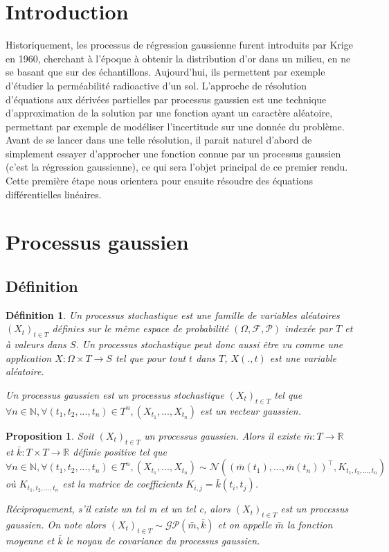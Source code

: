 \documentclass[a4paper,12pt]{article}
\newtheorem{definition}{Définition}
\newtheorem{proposition}{Proposition}
\begin{document}
\tableofcontents

\section{Introduction}

Historiquement, les processus de régression gaussienne furent introduits par Krige en 1960,
 cherchant à l’époque à obtenir la distribution d’or dans un milieu, en ne se basant que 
 sur des échantillons. Aujourd’hui, ils permettent par exemple d’étudier la perméabilité 
 radioactive d’un sol. L'approche de résolution d'équations aux dérivées partielles par 
 processus gaussien est une technique d'approximation de la solution par une fonction ayant
 un caractère aléatoire, permettant par exemple de modéliser l'incertitude sur une donnée du problème. 
 Avant de se lancer dans une telle résolution, il parait naturel d'abord de simplement essayer 
 d'approcher une fonction connue par un processus gaussien (c'est la régression gaussienne), 
 ce qui sera l'objet principal de ce premier rendu. Cette première étape nous orientera pour 
 ensuite résoudre des équations différentielles linéaires.

\section{Processus gaussien}

\subsection{Définition}

\begin{definition}
    Un processus stochastique est une famille de variables aléatoires $({X_t})_{t \in T}$ 
    définies sur le même espace de probabilité $(\Omega,\mathcal{F},\mathcal{P})$ indexée par 
    $T$ et à valeurs dans $S$. Un processus stochastique peut donc aussi être vu comme une application 
    $X:\Omega \times T \to S$ tel que 
    pour tout $t$ dans $T$, $X( . ,t)$ est une variable aléatoire.

    Un processus gaussien est un processus stochastique $({X_t})_{t \in T}$ tel que 
    $\forall n \in \mathbb{N}, \forall (t_1,t_2,...,t_n) \in T^{n}, (X_{t_1},...,X_{t_n})$
     est un vecteur gaussien.
\end{definition}

\begin{proposition}
    Soit $({X_t})_{t \in T}$ un processus gaussien. Alors il existe $\bar{m}:T \to \mathbb{R}$ et
     $\bar{k}:T \times T \to \mathbb{R}$ définie positive tel que $\forall n \in \mathbb{N},
      \forall (t_1,t_2,...,t_n) \in T^{n}, (X_{t_1},...,X_{t_n}) 
      \sim \mathcal{N}( (\bar{m}(t_1) , ... , \bar{m}(t_n))^\top , K_{t_1,t_2,...,t_n} )$ 
      où $K_{t_1,t_2,...,t_n}$ est la matrice de coefficients $K_{i,j}=\bar{k}(t_i,t_j)$.
    
    Réciproquement, s'il existe un tel m et un tel c, alors $({X_t})_{t \in T}$ est un processus gaussien. On note alors $({X_t})_{t \in T} \sim \mathcal{GP}(\bar{m},\bar{k})$ et on appelle $\bar{m}$ la fonction moyenne et $\bar{k}$ le noyau de covariance du processus gaussien.
\end{proposition}
\end{document}

